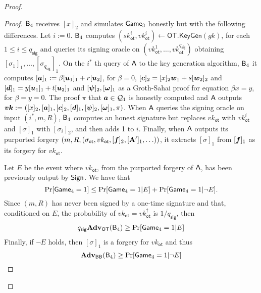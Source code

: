 \begin{proof}
\begin{proof}
$\mathsf{B}_4$ receives $[x]_2$ and simulates $\mathsf{Game}_3$ honestly but with the following differences. Let $i:=0$. $\mathsf{B}_4$ computes $(sk_\mathsf{ot}^i,vk_\mathsf{ot}^i)\gets\mathsf{OT}.\mathsf{KeyGen}(gk)$, for each $1\leq i\leq q_\mathsf{sig}$ and queries its signing oracle on $(vk_{\mathsf{ot}}^1,\ldots,vk_\mathsf{ot}^{q_{\mathsf{sig}}})$ obtaining $[\sigma_1]_1,\ldots,[\sigma_{q_\mathsf{sig}}]_1$. On the $i^*$ th query of $\mathsf{A}$ to the key generation algorithm, $\mathsf{B}_4$ it computes $[{\boldsymbol{a}}]_1:=\beta[{\boldsymbol{u}}_1]_1+r[{\boldsymbol{u}}_2]$, for $\beta=0$, $[{\boldsymbol{c}}]_2 = [x]_2{\boldsymbol{w}}_1+s[{\boldsymbol{w}}_2]_2$ and  $[{\boldsymbol{d}}]_1 = y[{\boldsymbol{u}}_1]_1 + t[{\boldsymbol{u}}_2]_1$ and $[{\boldsymbol{\psi}}]_2,[{\boldsymbol{\omega}}]_1$ as a Groth-Sahai proof for equation $\beta x = y$, for $\beta=y=0$. The proof $\pi$ that ${\boldsymbol{a}}\in\mathcal{Q}_1$ is honestly computed and $\mathsf{A}$ outputs ${\boldsymbol{vk}}:=([x]_2,[{\boldsymbol{a}}]_1,[{\boldsymbol{c}}]_2,[{\boldsymbol{d}}]_1,[{\boldsymbol{\psi}}]_2,[{\boldsymbol{\omega}}]_1,\pi)$. When $\mathsf{A}$ queries the signing oracle on input $(i^*,m,R)$, $\mathsf{B}_4$ computes an honest signature but replaces $vk_\mathsf{ot}$ with $vk_\mathsf{ot}^i$ and $[\sigma]_1$ with $[\sigma_i]_2$, and then adds 1 to $i$. Finally, when $\mathsf{A}$ outputs its purported forgery $(m,R,(\sigma_\mathsf{ot},vk_\mathsf{ot},[{\boldsymbol{f}}]_2,[\mathbf{{A}}']_1,\ldots))$, it extracts $[\sigma]_1$ from $[{\boldsymbol{f}}]_1$ as its forgery for $vk_\mathsf{ot}$.

Let $E$ be the event where $vk_\mathsf{ot}$, from the purported forgery of $\mathsf{A}$, has been previously output by $\mathsf{Sign}$. We have that
$$
\Pr[\mathsf{Game}_4=1]\leq \Pr[\mathsf{Game}_4=1|E]+\Pr[\mathsf{Game}_4=1|\neg E].
$$
Since  $(m,R)$ has never been signed by a one-time signature and that, conditioned on $E$, the probability of $vk_\mathsf{ot}=vk_\mathsf{ot}^\dag$ is $1/q_\mathsf{sig}$, then
\begin{align*}
q_{\mathsf{sig}}\mathbf{Adv}_\mathsf{OT}(\mathsf{B}_4)\geq  \Pr[\mathsf{Game}_4=1|E]
\end{align*}
Finally, if $\neg E$ holds, then $[\sigma]_1$ is a forgery for $vk_\mathsf{ot}$ and thus
$$
\mathbf{Adv}_{\mathsf{BB}}(\mathsf{B}_4)\geq \Pr[\mathsf{Game}_4=1|\neg E]$$
\end{proof}
\end{proof}

